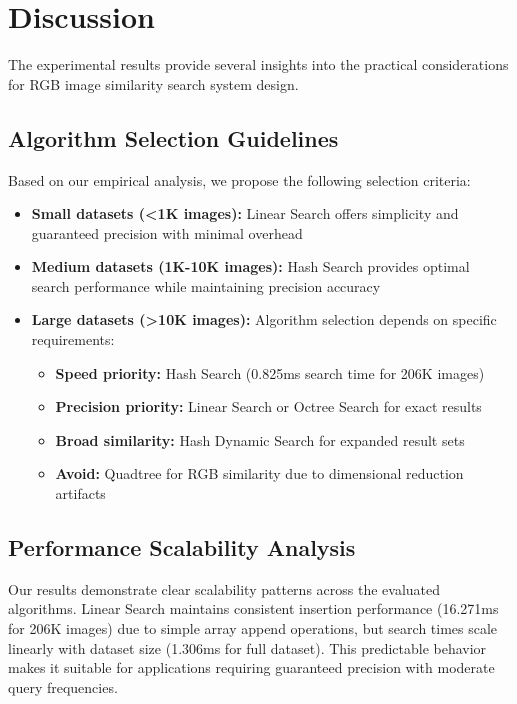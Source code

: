 \documentclass{sbc2023}
\begin{document}
\section{Discussion}
\label{sec:discussion}

The experimental results provide several insights into the practical considerations for RGB image similarity search system design.

\subsection{Algorithm Selection Guidelines}

Based on our empirical analysis, we propose the following selection criteria:

\begin{itemize}
    \item \textbf{Small datasets (<1K images):} Linear Search offers simplicity and guaranteed precision with minimal overhead
    
    \item \textbf{Medium datasets (1K-10K images):} Hash Search provides optimal search performance while maintaining precision accuracy
    
    \item \textbf{Large datasets (>10K images):} Algorithm selection depends on specific requirements:
    \begin{itemize}
        \item \textbf{Speed priority:} Hash Search (0.825ms search time for 206K images)
        \item \textbf{Precision priority:} Linear Search or Octree Search for exact results
        \item \textbf{Broad similarity:} Hash Dynamic Search for expanded result sets
        \item \textbf{Avoid:} Quadtree for RGB similarity due to dimensional reduction artifacts
    \end{itemize}
\end{itemize}

\subsection{Performance Scalability Analysis}

Our results demonstrate clear scalability patterns across the evaluated algorithms. Linear Search maintains consistent insertion performance (16.271ms for 206K images) due to simple array append operations, but search times scale linearly with dataset size (1.306ms for full dataset). This predictable behavior makes it suitable for applications requiring guaranteed precision with moderate query frequencies.
\end{document}
